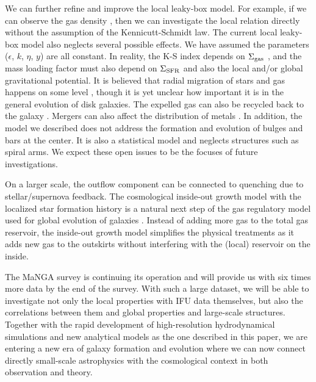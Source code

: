 \documentclass[12pt, appendixfloats, numberedappendix]{emulateapj}
\begin{document}
We can further refine and improve the local leaky-box model. For example, if we can observe the gas density \citep[\eg, as in the DiskMass Survey,][]{martinsson13a},
then we can investigate the local relation directly without the assumption of the Kennicutt-Schmidt law. 
The current local leaky-box model also neglects several possible effects. 
We have assumed the parameters ($\epsilon$, $k$, $\eta$, $y$) are all constant. 
In reality, the K-S index depends on $\Sigma_{\rm gas}$ \citep[\eg][]{bigiel08a}, and the mass loading factor 
must also depend on $\Sigma_{\rm SFR}$ \citep[][]{heckman15a} and also the local and/or global gravitational potential.
It is believed that radial migration of stars and gas happens on some level \citep[\eg][]{haywood08a},
though it is yet unclear how important it is in the general evolution of disk galaxies.
The expelled gas can also be recycled back to the galaxy \citep[\eg][]{oppenheimer10a, christensen16a}.
Mergers can also affect the distribution of metals \citep[\eg][]{rupke10a}.
In addition, the model we described does not address the formation and evolution of bulges and bars at the center.
It is also a statistical model and neglects structures such as spiral arms. 
We expect these open issues to be the focuses of future investigations.

On a larger scale, the outflow component can be connected to quenching due to stellar/supernova feedback.
The cosmological inside-out growth model with the localized star formation history is a natural next step of the gas regulatory model 
used for global evolution of galaxies \citep[\eg][]{bouche10a, lilly13a}. 
Instead of adding more gas to the total gas reservoir, the inside-out growth model simplifies the physical treatments 
as it adds new gas to the outskirts without interfering with the (local) reservoir on the inside. 

The MaNGA survey is continuing its operation and will provide us with six times more data by the end of the survey.
With such a large dataset, we will be able to investigate not only the local properties with IFU data themselves, 
but also the correlations between them and global properties and  large-scale structures.
Together with the rapid development of high-resolution hydrodynamical simulations and new analytical models as the one described in this paper,
we are entering a new era of galaxy formation and evolution where we can now connect directly small-scale astrophysics with the cosmological context 
in both observation and theory. 
\end{document}
